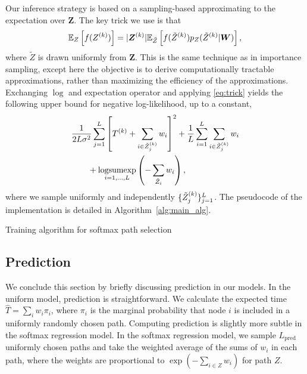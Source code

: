 \documentclass{article}
\begin{document}
Our inference strategy is based on a sampling-based approximating to the expectation over $\bm Z$. The key trick we use is that 
\begin{equation}
\label{eq:trick}
  \mathbb{E}_{Z}\left[{f(Z^{(k)})}\right] = |\bm Z^{(k)}| \mathbb{E}_{\tilde Z}\left[{f(\tilde Z^{(k)})p_Z(\tilde Z^{(k)}|\bm W)}\right],
\end{equation}
where $\tilde Z$ is drawn uniformly from $\bm Z$. This is the same technique as in importance sampling, except here the objective is to derive computationally tractable approximations, rather than maximizing the efficiency of the approximations. Exchanging $\log$ and expectation operator and applying \eqref{eq:trick} yields the following upper bound for negative log-likelihood, up to a constant,
\begin{align}
&\frac{1}{2L\sigma^2}\sum_{j=1}^L \left[{T^{(k)} + \sum_{i\in \tilde Z^{(k)}_j}w_i}\right]^2 + \frac{1}{L}\sum_{i=1}^L\sum_{i\in\tilde Z_{j}^{(k)}}w_i 
\label{eq:softmax_objective}
\\&\qquad + \underset{i=1,\ldots,L}{\text{logsumexp}}\left({-\sum_{\tilde Z_i} w_i}\right) \nonumber,
\end{align}
where we sample uniformly and independently $\{\tilde Z_j^{(k)}\}_{j=1}^L$. The pseudocode of the implementation is detailed in Algorithm~\ref{alg:main_alg}.

\begin{algorithm}
  \begin{algorithmic}
    
      \ENDFOR
  \end{algorithmic}
  \caption{Training algorithm for softmax path selection}
  \label{alg:main_alg}
\end{algorithm}


\subsection{Prediction}
\label{sub:predict}
We conclude this section by briefly discussing prediction in our models. In the uniform model, prediction is straightforward. We calculate the expected time $\hat T = \sum_i w_i \pi_i$, where $\pi_i$ is the marginal probability that node $i$ is included in a uniformly randomly chosen path. Computing prediction is slightly more subtle in the softmax regression model. In the softmax regression model, we sample $L_{\text{pred}}$ uniformly chosen paths and take the weighted average of the sums of $w_i$ in each path, where the weights are proportional to $\exp(-\sum_{i \in Z} w_i)$ for path $Z$. 
\end{document}

